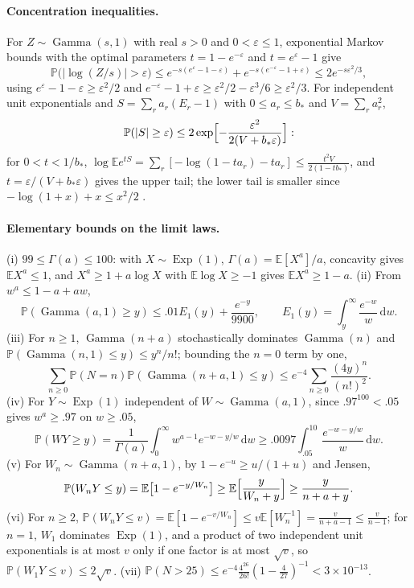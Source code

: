 \documentclass[11pt,a4paper]{article}
\theoremstyle{plain}
\theoremstyle{definition}
\theoremstyle{remark}
\newcommand{\E}{\mathbb E}
\newcommand{\Prob}{\mathbb P}
\newcommand{\Gam}{\operatorname{Gamma}}
\newcommand{\Ex}{\operatorname{Exp}}
\newcommand{\dd}{\,\mathrm d}
\newcommand{\eps}{\varepsilon}
\begin{document}
\paragraph{Concentration inequalities.}
For $Z\sim\Gam(s,1)$ with real $s>0$ and $0<\eps\le1$, exponential Markov bounds with the optimal parameters $t=1-e^{-\eps}$ and $t=e^{\eps}-1$ give
\begin{equation}\label{eq:chernoff}
\Prob\bigl(|\log(Z/s)|>\eps\bigr)\le e^{-s(e^{\eps}-1-\eps)}+e^{-s(e^{-\eps}-1+\eps)}\le2e^{-s\eps^2/3},
\end{equation}
using $e^{\eps}-1-\eps\ge\eps^2/2$ and $e^{-\eps}-1+\eps\ge\eps^2/2-\eps^3/6\ge\eps^2/3$. For independent unit exponentials and $S=\sum_ra_r(E_r-1)$ with $0\le a_r\le b_*$ and $V=\sum_ra_r^2$,
\begin{equation}\label{eq:bernstein}
\Prob(|S|\ge\eps)\le2\exp\Bigl[-\frac{\eps^2}{2(V+b_*\eps)}\Bigr]:
\end{equation}
for $0<t<1/b_*$, $\log\E e^{tS}=\sum_r[-\log(1-ta_r)-ta_r]\le\frac{t^2V}{2(1-tb_*)}$, and $t=\eps/(V+b_*\eps)$ gives the upper tail; the lower tail is smaller since $-\log(1+x)+x\le x^2/2$ \citep{boucheron2013}.

\paragraph{Elementary bounds on the limit laws.}
(i) $99\le\Gamma(a)\le100$: with $X\sim\Ex(1)$, $\Gamma(a)=\E[X^a]/a$, concavity gives $\E X^a\le1$, and $X^a\ge1+a\log X$ with $\E\log X\ge-1$ gives $\E X^a\ge1-a$. (ii) From $w^a\le1-a+aw$,
\begin{equation}\label{eq:blankup}
\Prob(\Gam(a,1)\ge y)\le.01E_1(y)+\frac{e^{-y}}{9900},\qquad E_1(y)=\int_y^\infty\frac{e^{-w}}w\dd w .
\end{equation}
(iii) For $n\ge1$, $\Gam(n+a)$ stochastically dominates $\Gam(n)$ and $\Prob(\Gam(n,1)\le y)\le y^n/n!$; bounding the $n=0$ term by one,
\begin{equation}\label{eq:missup}
\sum_{n\ge0}\Prob(N=n)\Prob(\Gam(n+a,1)\le y)\le e^{-4}\sum_{n\ge0}\frac{(4y)^n}{(n!)^2}.
\end{equation}
(iv) For $Y\sim\Ex(1)$ independent of $W\sim\Gam(a,1)$, since $.97^{100}<.05$ gives $w^a\ge.97$ on $w\ge.05$,
\begin{equation}\label{eq:blanklow}
\Prob(WY\ge y)=\frac1{\Gamma(a)}\int_0^\infty w^{a-1}e^{-w-y/w}\dd w\ge.0097\int_{.05}^{10}\frac{e^{-w-y/w}}w\dd w .
\end{equation}
(v) For $W_n\sim\Gam(n+a,1)$, by $1-e^{-u}\ge u/(1+u)$ and Jensen,
\begin{equation}\label{eq:misslow}
\Prob(W_nY\le y)=\E\bigl[1-e^{-y/W_n}\bigr]\ge\E\Bigl[\frac y{W_n+y}\Bigr]\ge\frac y{n+a+y}.
\end{equation}
(vi) For $n\ge2$, $\Prob(W_nY\le v)=\E[1-e^{-v/W_n}]\le v\E[W_n^{-1}]=\frac v{n+a-1}\le\frac v{n-1}$; for $n=1$, $W_1$ dominates $\Ex(1)$, and a product of two independent unit exponentials is at most $v$ only if one factor is at most $\sqrt v$, so $\Prob(W_1Y\le v)\le2\sqrt v$. (vii) $\Prob(N>25)\le e^{-4}\frac{4^{26}}{26!}(1-\frac4{27})^{-1}<3\times10^{-13}$.
\end{document}
